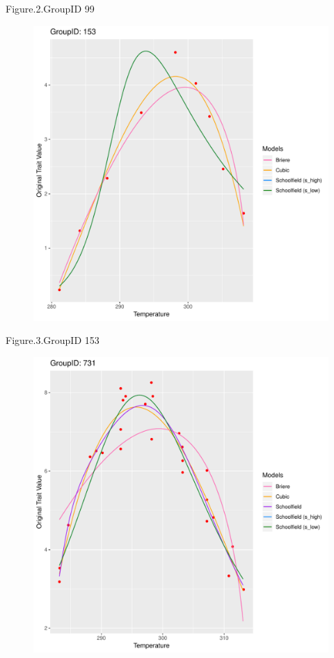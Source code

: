 \documentclass[12pt,a4paper]{article}
\begin{document}
Figure.2.GroupID 99
\\
\begin{figure}[H]
\centering
\includegraphics[width=\textwidth]{example3.pdf}
\end{figure}
Figure.3.GroupID 153
\\
\begin{figure}[H]
\centering
\includegraphics[width=\textwidth]{example4.pdf}
\end{figure}
\end{document}
